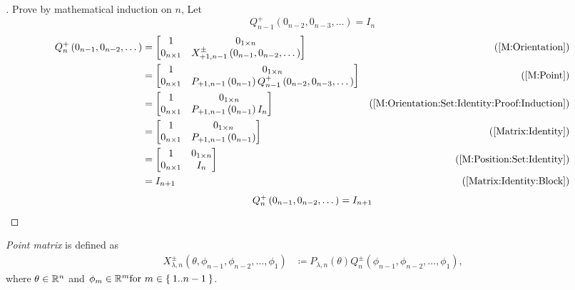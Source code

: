 \documentclass[../main.tex]{subfiles}
\begin{document}
\begin{proof}[]
Prove by mathematical induction on $n$,
Let
\begin{equation}\label{M:Orientation:Set:Identity:Proof:Induction}
Q^{+}_{n-1}\left(0_{n-2}, 0_{n-3},\dots\right)=I_n
\end{equation}
\begin{align*}
Q^{+}_n\left(0_{n-1}, 0_{n-2},\dots\right)
&=
\begin{bmatrix}
1&0_{1\times n}\\
0_{n\times 1}&X^{\pm}_{+1,n-1}\left(0_{n-1},0_{n-2},\dots\right)\\
\end{bmatrix}
&\text{(\cref{M:Orientation})}\\
&=
\begin{bmatrix}
1&0_{1\times n}\\
0_{n\times 1}&P_{+1,n-1}\left(0_{n-1}\right)Q^{+}_{n-1}\left(0_{n-2}, 0_{n-3},\dots\right)\\
\end{bmatrix}
&\text{(\cref{M:Point})}\\
&=
\begin{bmatrix}
1&0_{1\times n}\\
0_{n\times 1}&P_{+1,n-1}\left(0_{n-1}\right) I_n\\
\end{bmatrix}
&\text{(\cref{M:Orientation:Set:Identity:Proof:Induction})}\\
&=
\begin{bmatrix}
1&0_{1\times n}\\
0_{n\times 1}&P_{+1,n-1}\left(0_{n-1}\right)\\
\end{bmatrix}
&\text{(\cref{Matrix:Identity})}\\
&=
\begin{bmatrix}
1&0_{1\times n}\\
0_{n\times 1}&I_{n}\\
\end{bmatrix}
&\text{(\cref{M:Position:Set:Identity})}\\
&=
I_{n+1}
&\text{(\cref{Matrix:Identity:Block})}
\end{align*}
\begin{equation*}
Q^{+}_n
\left(0_{n-1}, 0_{n-2},\dots\right)
=
I_{n+1}
\qedhere
\end{equation*}
\end{proof}
\begin{definition}\label{M:Point}
\textit{Point matrix} is defined as
\begin{align*}
X^{\pm}_{\lambda,n}\left(\theta,\phi_{n-1},\phi_{n-2},\dots,\phi_1\right)&\coloneqq
P_{\lambda,n}\left(\theta\right)
Q^{\pm}_n\left(\phi_{n-1},\phi_{n-2},\dots,\phi_1\right)\text{,}
\end{align*}
where $\theta\in\mathbb{R}^n$ and $\phi_m\in\mathbb{R}^m\text{for } m\in\Set{1..n-1}$.
\end{definition}
\end{document}
